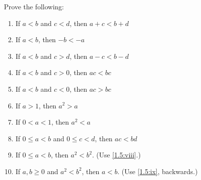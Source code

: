 \begin{pr} \label{1.5}
  Prove the following:
  \begin{enumerate}[label=(\roman*)]
    \item If $a<b$ and $c<d$, then $a+c<b+d$
    \item If $a<b$, then $-b<-a$
    \item If $a<b$ and $c>d$, then $a-c<b-d$
    \item If $a<b$ and $c>0$, then $ac<bc$
    \item If $a<b$ and $c<0$, then $ac>bc$
    \item If $a>1$, then $a^2>a$
    \item If $0<a<1$, then $a^2<a$
    \item \label{1.5:viii}
    If $0\leq a<b$ and $0\leq c<d$, then $ac<bd$
    \nopagebreak[3]
    \item \label{1.5:ix}
    If $0\leq a<b$, then $a^2<b^2$. (Use \ref{1.5:viii}.)
    \item If $a,b\geq0$ and $a^2<b^2$, then $a<b$.%
    (Use \ref{1.5:ix}, backwards.)
  \end{enumerate}
\end{pr}
\pagebreak
